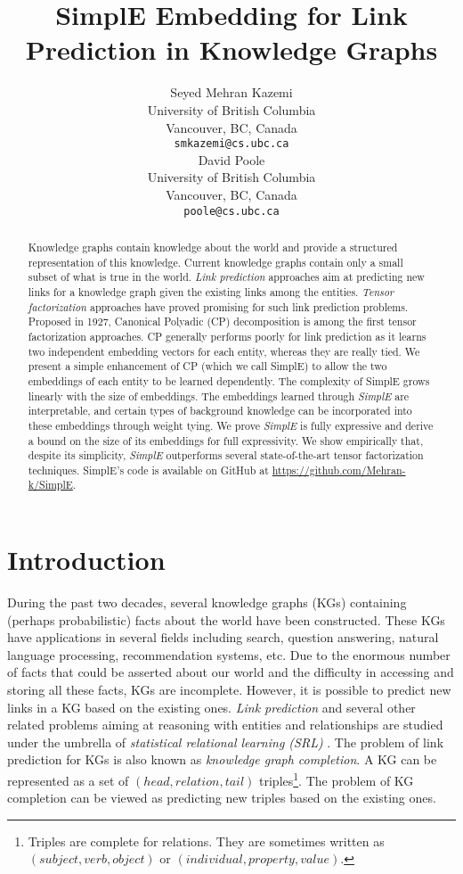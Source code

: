 \documentclass{article}
\title{SimplE Embedding for Link Prediction in Knowledge Graphs}
\author{
  Seyed Mehran Kazemi\\
  University of British Columbia\\
 Vancouver, BC, Canada \\
  \texttt{smkazemi@cs.ubc.ca} \\
\And
   David Poole \\
   University of British Columbia\\
  Vancouver, BC, Canada \\ 
    \texttt{poole@cs.ubc.ca} \\
}
\newcommand{\triple}[3]{(\mathit{#1}, \mathit{#2}, \mathit{#3})}
\begin{document}
\maketitle

\begin{abstract}
Knowledge graphs contain knowledge about the world and provide a structured representation of this knowledge. 
Current knowledge graphs contain only a small subset of what is true in the world. 
\emph{Link prediction} approaches aim at predicting new links for a knowledge graph given the existing links among the entities. 
\emph{Tensor factorization} approaches have proved promising for such link prediction problems. 
Proposed in 1927, Canonical Polyadic (CP) decomposition is among the first tensor factorization approaches. 
CP generally performs poorly for link prediction as it learns two independent embedding vectors for each entity, whereas they are really tied.
We present a simple enhancement of CP (which we call SimplE) to allow the two embeddings of each entity to be learned dependently. 
The complexity of SimplE grows linearly with the size of embeddings. 
The embeddings learned through \emph{SimplE} are interpretable, and certain types of background knowledge can be incorporated into these embeddings through weight tying. 
We prove \emph{SimplE} is fully expressive and derive a bound on the size of its embeddings for full expressivity. 
We show empirically that, despite its simplicity, \emph{SimplE} outperforms several state-of-the-art tensor factorization techniques.
SimplE's code is available on GitHub at \url{https://github.com/Mehran-k/SimplE}.
\end{abstract}

\section{Introduction}
During the past two decades, several knowledge graphs (KGs) containing (perhaps probabilistic) facts about the world have been constructed. These KGs have applications in several fields including search, question answering, natural language processing, recommendation systems, etc. Due to the enormous number of facts that could be asserted about our world and the difficulty in accessing and storing all these facts, KGs are incomplete. However, it is possible to predict new links in a KG based on the existing ones. \emph{Link prediction} and several other related problems aiming at reasoning with entities and relationships are studied under the umbrella of \emph{statistical relational learning (SRL)} \cite{getoor2007introduction,nickel2016review,StarAI-Book}. The problem of link prediction for KGs is also known as \emph{knowledge graph completion}. A KG can be represented as a set of $\triple{head}{relation}{tail}$ triples\footnote{Triples are complete for relations. They are sometimes written as $\triple{subject}{verb}{object}$ or $\triple{individual}{property}{value}$.}. The problem of KG completion can be viewed as predicting new triples based on the existing ones.
\end{document}
